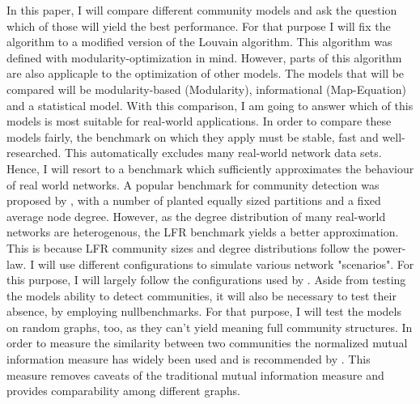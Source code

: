\documentclass{article}
\begin{document}
In this paper, I will compare different community models and ask the question which of those will yield the best performance. For that purpose I will fix the algorithm to a modified version of the Louvain algorithm. This algorithm was defined with modularity-optimization in mind. However, parts of this algorithm are also applicaple to the optimization of other models. The models that will be compared will be modularity-based (Modularity), informational (Map-Equation) and a statistical model.\cite{fortunato_CommunityDetectionNetworks_2016} With this comparison, I am going to answer which of this models is most suitable for real-world applications. 
In order to compare these models fairly, the benchmark on which they apply must be stable, fast and well-researched. This automatically excludes many real-world network data sets. Hence, I will resort to a benchmark which sufficiently approximates the behaviour of real world networks. A popular benchmark for community detection was proposed by \citeauthor{girvan_CommunityStructureSocial_2002}, with a number of planted equally sized partitions and a fixed average node degree. 
However, as the degree distribution of many real-world networks are heterogenous, the LFR benchmark yields a better approximation.\cite{lancichinetti_CommunityDetectionAlgorithms_2009} 
This is because LFR community sizes and degree distributions follow the power-law. I will use different configurations to simulate various network "scenarios". For this purpose, I will largely follow the configurations used by \citeauthor{lancichinetti_CommunityDetectionAlgorithms_2009}. Aside from testing the models ability to detect communities, it will also be necessary to test their absence, by employing nullbenchmarks. For that purpose, I will test the models on random graphs, too, as they can't yield meaning full community structures.
In order to measure the similarity between two communities the normalized mutual information measure has widely been used and is recommended by \citeauthor{fortunato_CommunityDetectionNetworks_2016}. This measure removes caveats of the traditional mutual information measure and provides comparability among different graphs.

\newpage
\printbibliography
\end{document}
